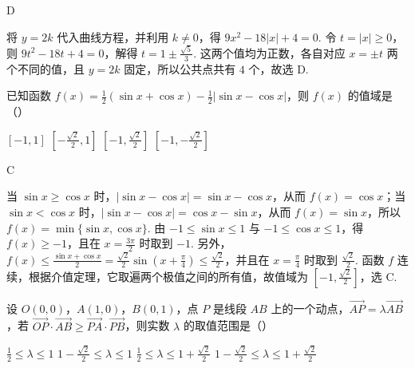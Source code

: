 \begin{answer}
D
\end{answer}

\begin{solution}
将 \(y=2k\) 代入曲线方程，并利用 \(k\neq0\)，得 \(9x^2-18|x|+4=0\). 令 \(t=|x|\geqslant0\)，则 \(9t^2-18t+4=0\)，解得 \(t=1\pm\frac{\sqrt{5}}{3}\). 这两个值均为正数，各自对应 \(x=\pm t\) 两个不同的值，且 \(y=2k\) 固定，所以公共点共有 \(4\) 个，故选 D.
\end{solution}

\begin{problem}
已知函数 \( f(x) = \frac{1}{2} (\sin x + \cos x) - \frac{1}{2} |\sin x - \cos x| \)，则 \( f(x) \) 的值域是（\quad）

\choices
    {\( \left[-1,1\right] \)}
    {\( \left[-\frac{\sqrt{2}}{2},1\right] \)}
    {\( \left[-1,\frac{\sqrt{2}}{2}\right] \)}
    {\(\left[-1, -\frac{\sqrt{2}}{2}\right]\)}
\end{problem}

\begin{answer}
C
\end{answer}

\begin{solution}
当 \(\sin x\geqslant\cos x\) 时，\(|\sin x-\cos x|=\sin x-\cos x\)，从而 \(f(x)=\cos x\)；当 \(\sin x<\cos x\) 时，\(|\sin x-\cos x|=\cos x-\sin x\)，从而 \(f(x)=\sin x\)，所以 \(f(x)=\min\{\sin x,\cos x\}\). 由 \(-1\leqslant\sin x\leqslant1\) 与 \(-1\leqslant\cos x\leqslant1\)，得 \(f(x)\geqslant-1\)，且在 \(x=\frac{3\pi}{2}\) 时取到 \(-1\). 另外，\(f(x)\leqslant\frac{\sin x+\cos x}{2}=\frac{\sqrt{2}}{2}\sin\left(x+\frac{\pi}{4}\right)\leqslant\frac{\sqrt{2}}{2}\)，并且在 \(x=\frac{\pi}{4}\) 时取到 \(\frac{\sqrt{2}}{2}\). 函数 \(f\) 连续，根据介值定理，它取遍两个极值之间的所有值，故值域为 \(\left[-1,\frac{\sqrt{2}}{2}\right]\)，选 C.
\end{solution}

\begin{problem}
设 \(O(0,0)\)，\(A(1,0)\)，\(B(0,1)\)，点 \(P\) 是线段 \(AB\) 上的一个动点，\(\overrightarrow{AP} = \lambda \overrightarrow{AB}\)，若 \(\overrightarrow{OP} \cdot \overrightarrow{AB} \geqslant \overrightarrow{PA} \cdot \overrightarrow{PB}\)，则实数 \(\lambda\) 的取值范围是（\quad）

\choices
    {\(\frac{1}{2} \leqslant \lambda \leqslant 1\)}
    {\(1 - \frac{\sqrt{2}}{2} \leqslant \lambda \leqslant 1\)}
    {\(\frac{1}{2} \leqslant \lambda \leqslant 1 + \frac{\sqrt{2}}{2}\)}
    {\(1 - \frac{\sqrt{2}}{2} \leqslant \lambda \leqslant 1 + \frac{\sqrt{2}}{2}\)}
\end{problem}


